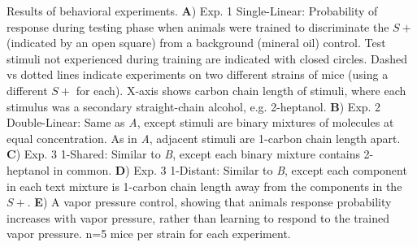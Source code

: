 \label{fig:results}
Results of behavioral experiments. \textbf{A}) Exp. 1 Single-Linear: Probability of response during testing phase when animals were trained to discriminate the $S+$ (indicated by an open square) from a background (mineral oil) control.  Test stimuli not experienced during training are indicated with closed circles.  Dashed vs dotted lines indicate experiments on two different strains of mice (using a different $S+$ for each).  X-axis shows carbon chain length of stimuli, where each stimulus was a secondary straight-chain alcohol, e.g. 2-heptanol.  \textbf{B})  Exp. 2 Double-Linear: Same as \textit{A}, except stimuli are binary mixtures of molecules at equal concentration.  As in \textit{A}, adjacent stimuli are 1-carbon chain length apart. \textbf{C}) Exp. 3 1-Shared: Similar to \textit{B}, except each binary mixture contains 2-heptanol in common. \textbf{D})  Exp. 3 1-Distant: Similar to \textit{B}, except each component in each text mixture is 1-carbon chain length away from the components in the $S+$. \textbf{E}) A vapor pressure control, showing that animals response probability increases with vapor pressure, rather than learning to respond to the trained vapor pressure.  n=5 mice per strain for each experiment.  
